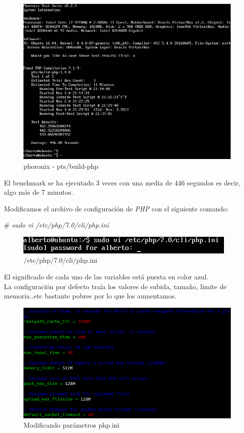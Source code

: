 \begin{figure}[h]
	\centering
	\includegraphics[scale=0.45]{images/prephp.png}
	\caption{phoronix - pts/build-php}
\end{figure} 

El benchmark se ha ejecutado 3 veces con una media de 446 segundos es decir, algo más de 7 minutos.

\newpage

Modificamos el archivo de configuración de \textit{PHP} con el siguiente comando:

\# \textit{sudo vi /etc/php/7.0/cli/php.ini} \\



\begin{figure}[h]
	\centering
	\includegraphics[scale=0.5]{images/phpini.png}
	\caption{/etc/php/7.0/cli/php.ini}
\end{figure} 

El significado de cada uno de las variables está puesta en color azul.\\ La configuración por defecto traía los valores de subida, tamaño, limite de memoria..etc bastante pobres por lo que los aumentamos.

\begin{figure}[h]
	\centering
	\includegraphics[scale=0.5]{images/prec.png}
	\caption{Modificando parámetros php.ini}
\end{figure} 




